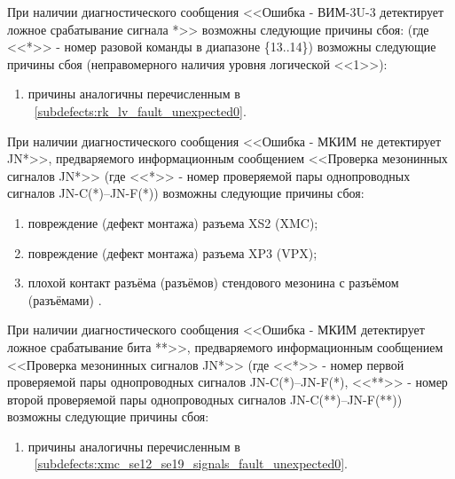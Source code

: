     \subpoint При наличии диагностического сообщения <<Ошибка - ВИМ-3U-3 детектирует ложное срабатывание сигнала *>> возможны следующие причины сбоя:
	      (где <<*>> - номер разовой команды в диапазоне \{13..14\}) возможны следующие причины сбоя (неправомерного наличия уровня логической <<1>>):
	\begin{enumerate}
	  \item причины аналогичны перечисленным в ~\ref{subdefects:rk_lv_fault_unexpected0}.
	\end{enumerate}
      
    \subpoint При наличии диагностического сообщения <<Ошибка - МКИМ не детектирует JN*>>, 
	      предваряемого информационным сообщением <<Проверка мезонинных сигналов JN*>> 
	      (где <<*>> - номер проверяемой пары однопроводных сигналов JN-C(*)--JN-F(*)) возможны следующие причины сбоя:
      \label{subdefects:xmc_se12_se19_signals_fault_unexpected0}
      \begin{enumerate}
	\item повреждение (дефект монтажа) разъема XS2 (XMC);
	\item повреждение (дефект монтажа) разъема XP3 (VPX);
	\item плохой контакт разъёма (разъёмов) стендового мезонина с разъёмом (разъёмами) \DocProductShortTitle.
      \end{enumerate}
    
    \subpoint При наличии диагностического сообщения <<Ошибка - МКИМ детектирует ложное срабатывание бита **>>, 
	      предваряемого информационным сообщением <<Проверка мезонинных сигналов JN*>> 
	      (где <<*>> - номер первой проверяемой пары однопроводных сигналов JN-C(*)--JN-F(*), <<**>> - номер второй проверяемой пары однопроводных сигналов JN-C(**)--JN-F(**)) возможны следующие причины сбоя:
      \begin{enumerate}
	\item причины аналогичны перечисленным в ~\ref{subdefects:xmc_se12_se19_signals_fault_unexpected0}.
      \end{enumerate}
      
